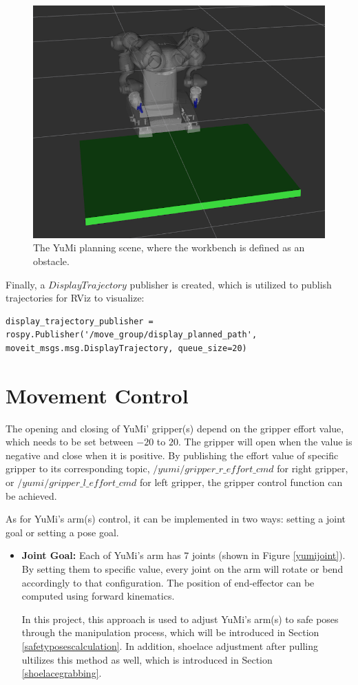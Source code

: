 \begin{figure}[H]
\centering
\includegraphics[width = 0.5\columnwidth]{Implementation/mp/planningscene.png}
\caption{The YuMi planning scene, where the workbench is defined as an obstacle.}
\label{scene}
\end{figure}

Finally, a $DisplayTrajectory$ publisher is created, which is utilized to publish trajectories for RViz to visualize:

\begin{verbatim}
display_trajectory_publisher = rospy.Publisher('/move_group/display_planned_path', 	moveit_msgs.msg.DisplayTrajectory, queue_size=20)
\end{verbatim}


\section{Movement Control} \label{movementcontrol}
The opening and closing of YuMi' gripper(s) depend on the gripper effort value, which needs to be set between $-20$ to $20$. The gripper will open when the value is negative and close when it is positive. By publishing the effort value of specific gripper to its corresponding topic, $/yumi/gripper\_r\_effort\_cmd$ for right gripper, or $/yumi/gripper\_l\_effort\_cmd$ for left gripper, the gripper control function can be achieved. 


As for YuMi's arm(s) control, it can be implemented in two ways: setting a joint goal or setting a pose goal.

\begin{itemize}
    \item \textbf{Joint Goal:} Each of YuMi's arm has 7 joints (shown in Figure \ref{yumijoint}). By setting them to specific value, every joint on the arm will rotate or bend accordingly to that configuration. The position of end-effector can be computed using forward kinematics.
    
    In this project, this approach is used to adjust YuMi's arm(s) to safe poses through the manipulation process, which will be introduced in Section \ref{safetyposescalculation}. In addition, shoelace adjustment after pulling ultilizes this method as well, which is introduced in Section \ref{shoelacegrabbing}.
\end{itemize}

